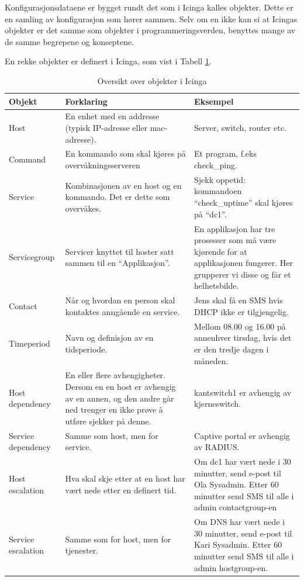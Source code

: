 Konfigurasjonsdataene er bygget rundt det som i Icinga kalles objekter. Dette er en samling av konfigurasjon som hører sammen. Selv om en ikke kan si at Icingas objekter er det samme som objekter i programmeringsverden, benyttes mange av de samme begrepene og konseptene.

En rekke objekter er definert i Icinga, som vist i Tabell \ref{objekter}.

\begin{changemargin}{-1cm}{-1cm}
\begin{table}
\begin{center}
\begin{tabular}{ | p{3.5cm} | p{6.5cm} | p{6cm} |} \hline
	\textbf{Objekt} & \textbf{Forklaring} & \textbf{Eksempel} \\ \hline
	Host & En enhet med en addresse (typisk IP-adresse eller mac-adresse). & Server, switch, router etc. \\ \hline
	Command & En kommando som skal kjøres på overvåkningsserveren & Et program, f.eks check\_ping. \\ \hline 
	Service & Kombinasjonen av en host og en kommando. Det er dette som overvåkes. & Sjekk oppetid: kommandoen “check\_uptime” skal kjøres på “dc1”. \\ \hline
	Servicegroup & Servicer knyttet til hoster satt sammen til en “Applikasjon”. & En applikasjon har tre prosesser som må være kjørende for at applikasjonen fungerer. Her grupperer vi disse og får et helhetsbilde. \\ \hline
	Contact & Når og hvordan en person skal kontaktes anngående en service. & Jens skal få en SMS hvis DHCP ikke er tilgjengelig. \\ \hline
	Timeperiod & Navn og definisjon av en tidsperiode. & Mellom 08.00 og 16.00 på annenhver tirsdag, hvis det er den tredje dagen i måneden. \\ \hline
	Host dependency & En eller flere avhengigheter. Dersom en en host er avhengig av en annen, og den andre går ned trenger en ikke prøve å utføre sjekker på denne. & kantswitch1 er avhengig av kjerneswitch. \\ \hline
	Service dependency & Samme som host, men for service. & Captive portal er avhengig av RADIUS. \\ \hline
	Host escalation & Hva skal skje etter at en host har vært nede etter en definert tid. &	Om dc1 har vært nede i 30 minutter, send e-post til Ola Sysadmin. Etter 60 minutter send SMS til alle i admin contactgroup-en \\ \hline
	Service escalation & Samme som for host, men for tjenester. & Om DNS har vært nede i 30 minutter, send e-post til Kari Sysadmin. Etter 60 minutter send SMS til alle i admin hostgroup-en. \\ \hline
	\end{tabular}
	\caption{Oversikt over objekter i Icinga}
	\label{objekter}
\end{center}
\end{table}
\end{changemargin}

